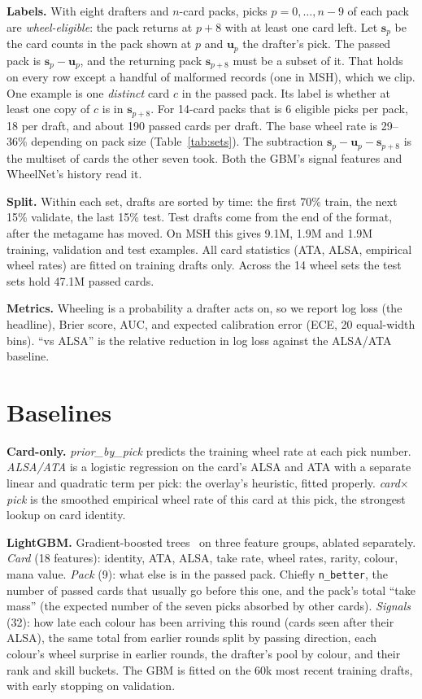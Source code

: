 \documentclass[10pt,letterpaper]{article}
\begin{document}
\textbf{Labels.} With eight drafters and $n$-card packs, picks $p = 0,\dots,n-9$ of each pack are
\emph{wheel-eligible}: the pack returns at $p+8$ with at least one card left. Let $\mathbf{s}_p$ be the card counts
in the pack shown at $p$ and $\mathbf{u}_p$ the drafter's pick. The passed pack is $\mathbf{s}_p - \mathbf{u}_p$,
and the returning pack $\mathbf{s}_{p+8}$ must be a subset of it. That holds on every row except a handful of
malformed records (one in MSH), which we clip. One example is one \emph{distinct} card $c$ in the passed pack.
Its label is whether at least one copy of $c$ is in $\mathbf{s}_{p+8}$. For 14-card packs that is 6 eligible
picks per pack, 18 per draft, and about 190 passed cards per draft. The base wheel rate is 29--36\% depending on
pack size (Table~\ref{tab:sets}). The subtraction $\mathbf{s}_p - \mathbf{u}_p - \mathbf{s}_{p+8}$ is the multiset of
cards the other seven took. Both the GBM's signal features and WheelNet's history read it.

\textbf{Split.} Within each set, drafts are sorted by time: the first 70\% train, the next 15\% validate, the last
15\% test. Test drafts come from the end of the format, after the metagame has moved. On MSH this gives 9.1M, 1.9M
and 1.9M training, validation and test examples. All card statistics (ATA, ALSA, empirical wheel rates) are fitted
on training drafts only. Across the 14 wheel sets the test sets hold 47.1M passed cards.

\textbf{Metrics.} Wheeling is a probability a drafter acts on, so we report log loss (the headline), Brier score,
AUC, and expected calibration error (ECE, 20 equal-width bins). ``vs ALSA'' is the relative reduction in log loss
against the ALSA/ATA baseline.

\section{Baselines}\label{sec:baselines}

\textbf{Card-only.} \emph{prior\_by\_pick} predicts the training wheel rate at each pick number. \emph{ALSA/ATA}
is a logistic regression on the card's ALSA and ATA with a separate linear and quadratic term per pick: the
overlay's heuristic, fitted properly. \emph{card$\times$pick} is the smoothed empirical wheel rate of this card at
this pick, the strongest lookup on card identity.

\textbf{LightGBM.} Gradient-boosted trees~\cite{lightgbm} on three feature groups, ablated separately.
\emph{Card} (18 features): identity, ATA, ALSA, take rate, wheel rates, rarity, colour, mana value.
\emph{Pack} (9): what else is in the passed pack. Chiefly \texttt{n\_better}, the number of passed cards that
usually go before this one, and the pack's total ``take mass'' (the expected number of the seven picks absorbed by other
cards). \emph{Signals} (32): how late each colour has been arriving this round (cards seen after their ALSA),
the same total from earlier rounds split by passing direction, each colour's wheel surprise in earlier rounds,
the drafter's pool by colour, and their rank and skill buckets. The GBM is fitted on the 60k most recent
training drafts, with early stopping on validation.
\end{document}
